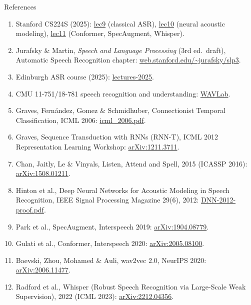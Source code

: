 \begin{frame}[allowframebreaks]{References}
  \begin{enumerate}\footnotesize
    \item Stanford CS224S (2025):
      \href{https://web.stanford.edu/class/cs224s/semesters/2025-spring/lecture-slides/224s.25.lec9.pdf}{lec9} (classical ASR),
      \href{https://web.stanford.edu/class/cs224s/semesters/2025-spring/lecture-slides/224s.25.lec10.pdf}{lec10} (neural acoustic modeling),
      \href{https://web.stanford.edu/class/cs224s/semesters/2025-spring/lecture-slides/224s.25.lec11.pdf}{lec11} (Conformer, SpecAugment, Whisper).
    \item Jurafsky \& Martin, \textit{Speech and Language Processing} (3rd ed.\ draft), Automatic Speech Recognition chapter: \href{https://web.stanford.edu/~jurafsky/slp3/}{web.stanford.edu/\textasciitilde jurafsky/slp3}.
    \item Edinburgh ASR course (2025): \href{https://www.inf.ed.ac.uk/teaching/courses/asr/lectures-2025.html}{lectures-2025}.
    \item CMU 11-751/18-781 speech recognition and understanding: \href{https://www.wavlab.org/activities/2023/11751-2023f/}{WAVLab}.
    \item Graves, Fern\'andez, Gomez \& Schmidhuber, Connectionist Temporal Classification, ICML 2006: \href{https://www.cs.toronto.edu/~graves/icml_2006.pdf}{icml\_2006.pdf}.
    \item Graves, Sequence Transduction with RNNs (RNN-T), ICML 2012 Representation Learning Workshop: \href{https://arxiv.org/abs/1211.3711}{arXiv:1211.3711}.
    \item Chan, Jaitly, Le \& Vinyals, Listen, Attend and Spell, 2015 (ICASSP 2016): \href{https://arxiv.org/abs/1508.01211}{arXiv:1508.01211}.
    \item Hinton et al., Deep Neural Networks for Acoustic Modeling in Speech Recognition, IEEE Signal Processing Magazine 29(6), 2012: \href{https://www.cs.toronto.edu/~hinton/absps/DNN-2012-proof.pdf}{DNN-2012-proof.pdf}.
    \item Park et al., SpecAugment, Interspeech 2019: \href{https://arxiv.org/abs/1904.08779}{arXiv:1904.08779}.
    \item Gulati et al., Conformer, Interspeech 2020: \href{https://arxiv.org/abs/2005.08100}{arXiv:2005.08100}.
    \item Baevski, Zhou, Mohamed \& Auli, wav2vec 2.0, NeurIPS 2020: \href{https://arxiv.org/abs/2006.11477}{arXiv:2006.11477}.
    \item Radford et al., Whisper (Robust Speech Recognition via Large-Scale Weak Supervision), 2022 (ICML 2023): \href{https://arxiv.org/abs/2212.04356}{arXiv:2212.04356}.

\end{enumerate}
\end{frame}
